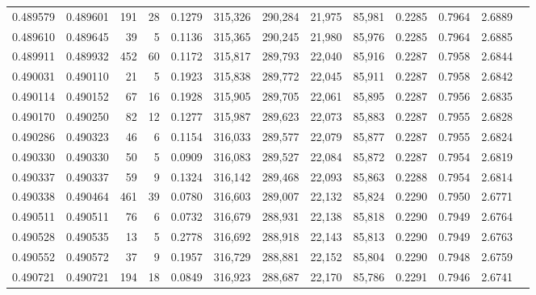 \begin{tabular}{rrrrrrrrrrrrr}
0.489579 & 0.489601 &   191 &    28 &                                     0.1279 & 315,326 & 290,284 &  21,975 &  85,981 & 0.2285 & 0.7964 & 2.6889 \\
0.489610 & 0.489645 &    39 &     5 &                                     0.1136 & 315,365 & 290,245 &  21,980 &  85,976 & 0.2285 & 0.7964 & 2.6885 \\
0.489911 & 0.489932 &   452 &    60 &                                     0.1172 & 315,817 & 289,793 &  22,040 &  85,916 & 0.2287 & 0.7958 & 2.6844 \\
0.490031 & 0.490110 &    21 &     5 &                                     0.1923 & 315,838 & 289,772 &  22,045 &  85,911 & 0.2287 & 0.7958 & 2.6842 \\
0.490114 & 0.490152 &    67 &    16 &                                     0.1928 & 315,905 & 289,705 &  22,061 &  85,895 & 0.2287 & 0.7956 & 2.6835 \\
0.490170 & 0.490250 &    82 &    12 &                                     0.1277 & 315,987 & 289,623 &  22,073 &  85,883 & 0.2287 & 0.7955 & 2.6828 \\
0.490286 & 0.490323 &    46 &     6 &                                     0.1154 & 316,033 & 289,577 &  22,079 &  85,877 & 0.2287 & 0.7955 & 2.6824 \\
0.490330 & 0.490330 &    50 &     5 &                                     0.0909 & 316,083 & 289,527 &  22,084 &  85,872 & 0.2287 & 0.7954 & 2.6819 \\
0.490337 & 0.490337 &    59 &     9 &                                     0.1324 & 316,142 & 289,468 &  22,093 &  85,863 & 0.2288 & 0.7954 & 2.6814 \\
0.490338 & 0.490464 &   461 &    39 &                                     0.0780 & 316,603 & 289,007 &  22,132 &  85,824 & 0.2290 & 0.7950 & 2.6771 \\
0.490511 & 0.490511 &    76 &     6 &                                     0.0732 & 316,679 & 288,931 &  22,138 &  85,818 & 0.2290 & 0.7949 & 2.6764 \\
0.490528 & 0.490535 &    13 &     5 &                                     0.2778 & 316,692 & 288,918 &  22,143 &  85,813 & 0.2290 & 0.7949 & 2.6763 \\
0.490552 & 0.490572 &    37 &     9 &                                     0.1957 & 316,729 & 288,881 &  22,152 &  85,804 & 0.2290 & 0.7948 & 2.6759 \\
0.490721 & 0.490721 &   194 &    18 &                                     0.0849 & 316,923 & 288,687 &  22,170 &  85,786 & 0.2291 & 0.7946 & 2.6741 \\

\end{tabular}
